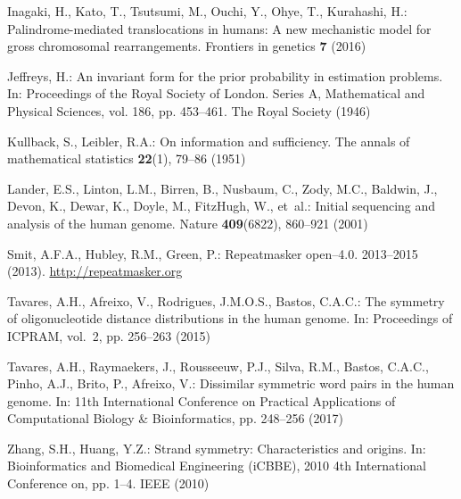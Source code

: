 \documentclass[review,12pt]{elsarticle}
\begin{document}
\begin{thebibliography}{10}
Inagaki, H., Kato, T., Tsutsumi, M., Ouchi, Y., Ohye, T., Kurahashi, H.:
  Palindrome-mediated translocations in humans: A new mechanistic model for
  gross chromosomal rearrangements.
\newblock Frontiers in genetics \textbf{7} (2016)

Jeffreys, H.: An invariant form for the prior probability in estimation
  problems.
\newblock In: Proceedings of the {R}oyal {S}ociety of {L}ondon. Series {A},
  {M}athematical and {P}hysical {S}ciences, vol. 186, pp. 453--461. The Royal
  Society (1946)

Kullback, S., Leibler, R.A.: On information and sufficiency.
\newblock The annals of mathematical statistics \textbf{22}(1), 79--86 (1951)

Lander, E.S., Linton, L.M., Birren, B., Nusbaum, C., Zody, M.C., Baldwin, J.,
  Devon, K., Dewar, K., Doyle, M., FitzHugh, W., et~al.: Initial sequencing and
  analysis of the human genome.
\newblock Nature \textbf{409}(6822), 860--921 (2001)

Smit, A.F.A., Hubley, R.M., Green, P.: Repeatmasker open--4.0. 2013--2015
  (2013).
\newblock \urlprefix\url{http://repeatmasker.org}

Tavares, A.H., Afreixo, V., Rodrigues, J.M.O.S., Bastos, C.A.C.: The symmetry
  of oligonucleotide distance distributions in the human genome.
\newblock In: Proceedings of ICPRAM, vol.~2, pp. 256--263 (2015)

Tavares, A.H., Raymaekers, J., Rousseeuw, P.J., Silva, R.M., Bastos, C.A.C.,
  Pinho, A.J., Brito, P., Afreixo, V.: Dissimilar symmetric word pairs in the
  human genome.
\newblock In: 11th International Conference on Practical Applications of
  Computational Biology {\&} Bioinformatics, pp. 248--256 (2017)

Zhang, S.H., Huang, Y.Z.: Strand symmetry: Characteristics and origins.
\newblock In: Bioinformatics and Biomedical Engineering (iCBBE), 2010 4th
  International Conference on, pp. 1--4. IEEE (2010)

\end{thebibliography}
\end{document}
